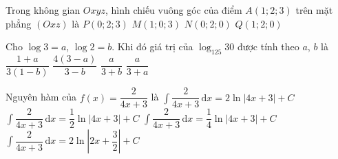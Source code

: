 \begin{ex}%
Trong không gian $Oxyz$, hình chiếu vuông góc của điểm $A(1;2;3)$ trên mặt phẳng $\left(Oxz\right)$ là
	\choice
	{$P(0;2;3)$}
	{\True $M(1;0;3)$}
	{$N(0;2;0)$}
	{$Q(1;2;0)$}
\end{ex}
\begin{ex}%
	Cho $\log3=a$, $\log2=b$. Khi đó giá trị của $\log_{125}30$ được tính theo $a$, $b$ là 
	\choice
	{\True $\dfrac{1+a}{3(1-b)}$}
	{$\dfrac{4(3-a)}{3-b}$}
	{$\dfrac{a}{3+b}$}
	{$\dfrac{a}{3+a}$}
\end{ex}
\begin{ex}%
	Nguyên hàm của $f(x)=\dfrac{2}{4x+3}$ là 
	\choice
	{$\displaystyle\int\limits \dfrac{2}{4x+3}\mathrm{\,d}x=2\ln \left|4x+3\right|+C$}
	{\True $\displaystyle\int\limits \dfrac{2}{4x+3}\mathrm{\,d}x=\dfrac{1}{2}\ln \left|4x+3\right|+C$}
	{$\displaystyle\int\limits \dfrac{2}{4x+3}\mathrm{\,d}x=\dfrac{1}{4}\ln \left|4x+3\right|+C$}
	{$\displaystyle\int\limits \dfrac{2}{4x+3}\mathrm{\,d}x=2\ln \left|2x+\dfrac{3}{2}\right|+C$}
\end{ex}

